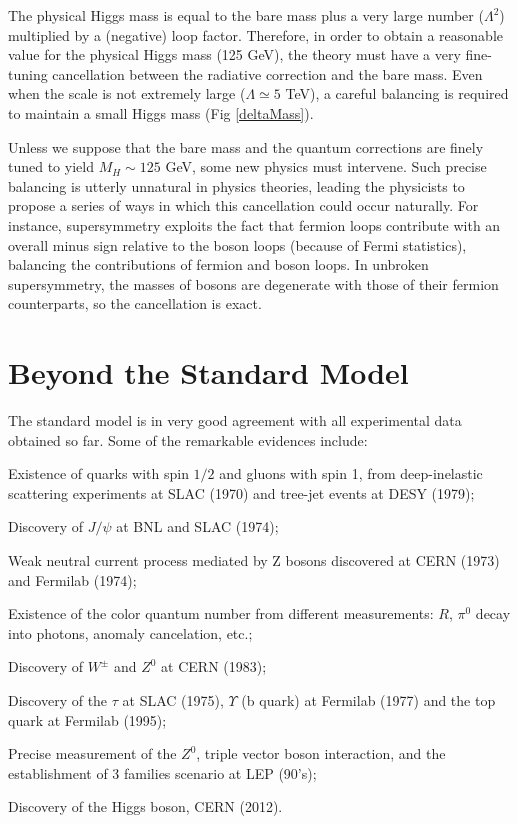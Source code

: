 The physical Higgs mass  is equal to the bare mass plus a very large number ($\Lambda^2$) multiplied by a (negative) loop factor. Therefore, in order to obtain a reasonable value for the physical Higgs mass (125 GeV), the theory must have a very fine-tuning cancellation between the radiative correction and the bare mass. Even when the scale is not extremely large ($\Lambda \simeq 5$ TeV), a careful balancing is required to maintain a small Higgs mass (Fig \ref{deltaMass}).
 
Unless we suppose that the bare mass and the quantum corrections are finely tuned to yield $M_H\sim 125$ GeV, some new physics must intervene. Such precise balancing is utterly unnatural in physics theories, leading the physicists to propose a series of ways in which this cancellation could occur naturally. For instance, supersymmetry\cite{Martin:1997ns} exploits the fact that fermion loops contribute with an overall minus sign relative to the boson loops (because of Fermi statistics), balancing the contributions of fermion and boson loops. In unbroken supersymmetry, the masses of bosons are degenerate with those of their fermion counterparts, so the cancellation is exact.

\section{Beyond the Standard Model}

The standard model is in very good agreement with all experimental data obtained so far. Some of the remarkable evidences include:

\begin{compact_itemize}
	\item Existence of quarks with spin $1/2$ and gluons with spin 1, from deep-inelastic scattering experiments at SLAC (1970) and tree-jet events at DESY (1979); 
	\item Discovery of $J/\psi$ at BNL and SLAC (1974);
	\item Weak neutral current process mediated by Z bosons discovered at CERN (1973) and Fermilab (1974); 
	\item Existence of the color quantum number from different measurements: $R$, $\pi^0$ decay into photons,  anomaly cancelation, etc.; 
	\item Discovery of $W^\pm$ and $Z^0$ at CERN (1983);
	\item Discovery of the $\tau$ at SLAC (1975), $\Upsilon$ (b quark) at Fermilab (1977) and the top quark at Fermilab (1995);
	\item Precise measurement of the $Z^0$, triple vector boson interaction, and the establishment of 3 families scenario at LEP (90's);
	\item Discovery of the Higgs boson, CERN (2012).
\end{compact_itemize}

